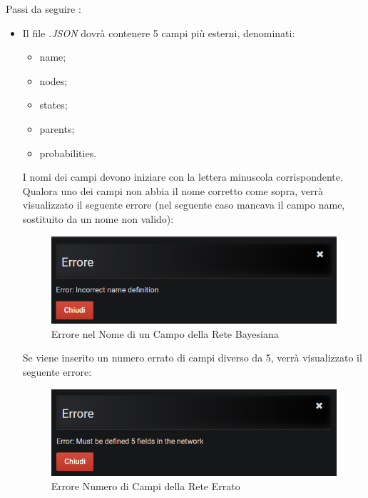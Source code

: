 Passi da seguire :
\begin{itemize}
 \item Il file \textit{.JSON} dovrà contenere 5 campi più esterni, denominati:
 	\begin{itemize}
 		\item name;
 		\item nodes;
 		\item states;
 		\item parents;
 		\item probabilities.
 	\end{itemize}
 	I nomi dei campi devono iniziare con la lettera minuscola corrispondente. Qualora uno dei campi non abbia il nome corretto come sopra, verrà visualizzato il seguente errore (nel seguente caso mancava il campo name, sostituito da un nome non valido): 
 	\begin{figure}[H]
	\begin{center}
		\includegraphics[scale=0.6]{./images/erroreNomeCampo.png}
		 \caption{Errore nel Nome di un Campo della Rete Bayesiana}	
		 \label{ImgRete}
	\end{center}
\end{figure}

	Se viene inserito un numero errato di campi diverso da 5, verrà visualizzato il seguente errore:
	
	\begin{figure}[H]
	\begin{center}
		\includegraphics[scale=0.6]{./images/wrongNumberOfFields.png}
		 \caption{Errore Numero di Campi della Rete Errato}	
		 \label{ImgRete}
	\end{center}
\end{figure}


\end{itemize}
